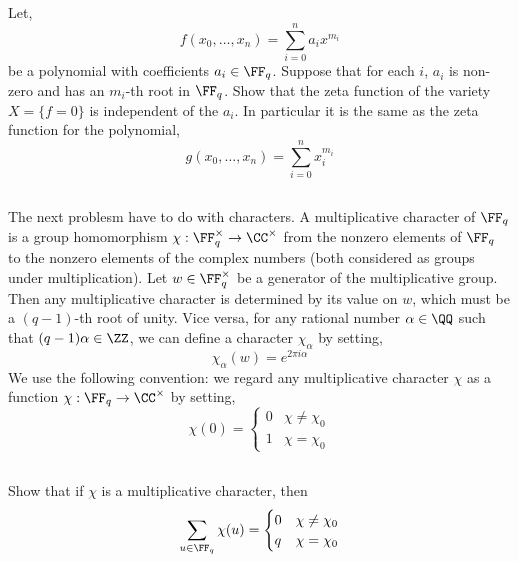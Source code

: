 \documentclass[12pt]{article}
\begin{document}
\subsection{}

Let,
\[ f(x_0, \dots, x_n) = \sum_{i = 0}^n a_i x^{m_i} \]
be a polynomial with coefficients $a_i \in \FF_q$. Suppose that for each $i$, $a_i$ is non-zero and has an $m_i$-th root in $\FF_q$. Show that the zeta function of the variety $X = \{ f = 0 \}$ is independent of the $a_i$. In particular it is the same as the zeta function for the polynomial,
\[ g(x_0, \dots, x_n) = \sum_{i = 0}^n x_i^{m_i} \]

\subsection{}

The next problesm have to do with characters. A multiplicative character of $\FF_q$ is a group homomorphism $\chi : \FF_q^\times \to \CC^\times$ from the nonzero elements of $\FF_q$ to the nonzero elements of the complex numbers (both considered as groups under multiplication). Let $w \in \FF_q^\times$ be a generator of the multiplicative group. Then any multiplicative character is determined by its value on $w$, which must be a $(q-1)$-th root of unity. Vice versa, for any rational number $\alpha \in \QQ$ such that $(q-1) \alpha \in \ZZ$, we can define a character $\chi_\alpha$ by setting,
\[ \chi_\alpha(w) = e^{2 \pi i \alpha} \]
We use the following convention: we regard any multiplicative character $\chi$ as a function $\chi : \FF_q \to \CC^\times$ by setting,
\[ \chi(0) = 
\begin{cases}
0 & \chi \neq \chi_0
\\
1 & \chi = \chi_0 
\end{cases} \]

\subsection{}

Show that if $\chi$ is a multiplicative character, then
\[ \sum_{u \in \FF_q} \chi(u) = 
\begin{cases}
0 & \chi \neq \chi_0
\\
q & \chi = \chi_0 
\end{cases} \]

\subsection{}
\end{document}
